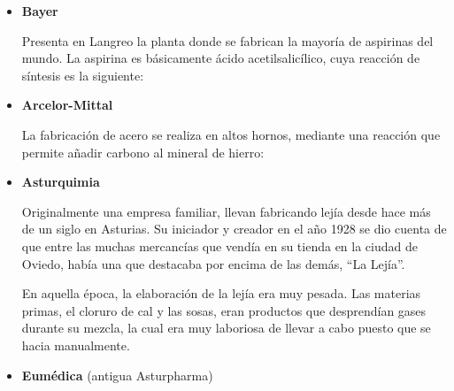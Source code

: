 \documentclass[
  spanish,
]{article}
\begin{document}
\begin{itemize}
\item
  \textbf{Bayer}

  Presenta en Langreo la planta donde se fabrican la mayoría de
  aspirinas del mundo. La aspirina es básicamente ácido
  acetilsalicílico, cuya reacción de síntesis es la siguiente:

  \hfill{}
\item
  \textbf{Arcelor-Mittal}

  La fabricación de acero se realiza en altos hornos, mediante una
  reacción que permite añadir carbono al mineral de hierro:

  \hfill{}
\item
  \textbf{Asturquimia}

  Originalmente una empresa familiar, llevan fabricando lejía desde hace
  más de un siglo en Asturias. Su iniciador y creador en el año 1928 se
  dio cuenta de que entre las muchas mercancías que vendía en su tienda
  en la ciudad de Oviedo, había una que destacaba por encima de las
  demás, ``La Lejía''.

  En aquella época, la elaboración de la lejía era muy pesada. Las
  materias primas, el cloruro de cal y las sosas, eran productos que
  desprendían gases durante su mezcla, la cual era muy laboriosa de
  llevar a cabo puesto que se hacia manualmente.
\item
  \textbf{Eumédica} (antigua Asturpharma)


\end{itemize}
\end{document}
